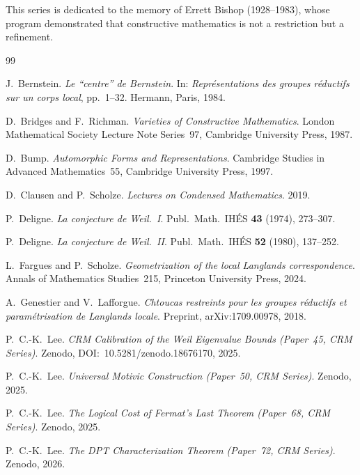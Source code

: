 \documentclass[12pt, a4paper]{article}
\theoremstyle{plain}
\theoremstyle{definition}
\theoremstyle{remark}
\begin{document}
This series is dedicated to the memory of Errett Bishop (1928--1983),
whose program demonstrated that constructive mathematics is not a
restriction but a refinement.

\begin{thebibliography}{99}

J.~Bernstein.
\textit{Le ``centre'' de Bernstein}.
In: \textit{Repr\'esentations des groupes r\'eductifs sur un corps local},
pp.~1--32. Hermann, Paris, 1984.

D.~Bridges and F.~Richman.
\textit{Varieties of Constructive Mathematics}.
London Mathematical Society Lecture Note Series~97,
Cambridge University Press, 1987.

D.~Bump.
\textit{Automorphic Forms and Representations}.
Cambridge Studies in Advanced Mathematics~55,
Cambridge University Press, 1997.

D.~Clausen and P.~Scholze.
\textit{Lectures on Condensed Mathematics}.
2019.

P.~Deligne.
\textit{La conjecture de Weil.~I}.
Publ.\ Math.\ IH\'ES \textbf{43} (1974), 273--307.

P.~Deligne.
\textit{La conjecture de Weil.~II}.
Publ.\ Math.\ IH\'ES \textbf{52} (1980), 137--252.

L.~Fargues and P.~Scholze.
\textit{Geometrization of the local Langlands correspondence}.
Annals of Mathematics Studies~215, Princeton University Press, 2024.

A.~Genestier and V.~Lafforgue.
\textit{Chtoucas restreints pour les groupes r\'eductifs et
param\'etrisation de Langlands locale}.
Preprint, arXiv:1709.00978, 2018.

P.~C.-K.~Lee.
\textit{CRM Calibration of the Weil Eigenvalue Bounds
(Paper~45, CRM Series)}.
Zenodo, DOI:~10.5281/zenodo.18676170, 2025.

P.~C.-K.~Lee.
\textit{Universal Motivic Construction
(Paper~50, CRM Series)}.
Zenodo, 2025.

P.~C.-K.~Lee.
\textit{The Logical Cost of Fermat's Last Theorem
(Paper~68, CRM Series)}.
Zenodo, 2025.

P.~C.-K.~Lee.
\textit{The DPT Characterization Theorem
(Paper~72, CRM Series)}.
Zenodo, 2026.


\end{thebibliography}
\end{document}

